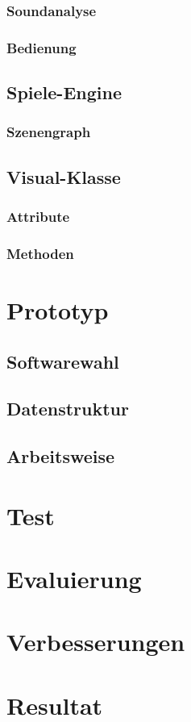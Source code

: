 \subsubsection{Soundanalyse}

\subsubsection{Bedienung}

\subsection{Spiele-Engine}

\subsubsection{Szenengraph}

\subsection{Visual-Klasse}

\subsubsection{Attribute}

\subsubsection{Methoden}



\section{Prototyp}

\subsection{Softwarewahl}

\subsection{Datenstruktur}

\subsection{Arbeitsweise}



\section{Test}

\section{Evaluierung}

\section{Verbesserungen}

\section{Resultat}
